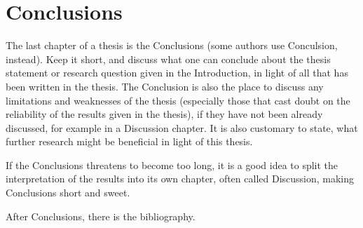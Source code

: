 \section*{Conclusions}


The last chapter of a thesis is the Conclusions (some authors use
Conculsion, instead).  Keep it short, and discuss what one can
conclude about the thesis statement or research question given in the
Introduction, in light of all that has been written in the thesis.
The Conclusion is also the place to discuss any limitations and
weaknesses of the thesis (especially those that cast doubt on the
reliability of the results given in the thesis), if they have not been
already discussed, for example in a Discussion chapter.  It is also
customary to state, what further research might be beneficial in light
of this thesis.

If the Conclusions threatens to become too long, it is a good idea to
split the interpretation of the results into its own chapter, often
called Discussion, making Conclusions short and sweet.

After Conclusions, there is the bibliography.
